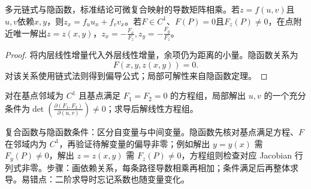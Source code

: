 \begin{theorem}{多元链式与隐函数，标准结论}可微复合映射的导数矩阵相乘。若$z=f(u,v)$且$u,v$依赖$x,y$，则$z_x=f_uu_x+f_vv_x$。若$F\in C^1$、$F(P)=0$且$F_z(P)\ne0$，在点附近唯一解出$z=z(x,y)$，$z_x=-\frac{F_x}{F_z},z_y=-\frac{F_y}{F_z}$。\end{theorem}
\begin{proof}将内层线性增量代入外层线性增量，余项仍为距离的小量。隐函数关系为\[F(x,y,z(x,y))=0.\]对该关系使用链式法则得到偏导公式；局部可解性来自隐函数定理。\end{proof}
对在基点邻域为 $C^1$ 且基点满足 $F_1=F_2=0$ 的方程组，局部解出 $u,v$ 的一个充分条件为$\det\left(\frac{\partial(F_1,F_2)}{\partial(u,v)}\right)\ne0$；求导后解线性方程组。

\begin{method}{复合函数与隐函数}条件：区分自变量与中间变量。隐函数先核对基点满足方程、$F$ 在邻域内为 $C^1$，再验证待解变量的偏导非零；例如解出 $y=y(x)$ 需 $F_y(P)\ne0$，解出 $z=z(x,y)$ 需 $F_z(P)\ne0$，方程组则检查对应 Jacobian 行列式非零。步骤：画依赖关系，每条路径导数相乘再相加；条件满足后再整体求导。易错点：二阶求导时忘记系数也随变量变化。\end{method}
